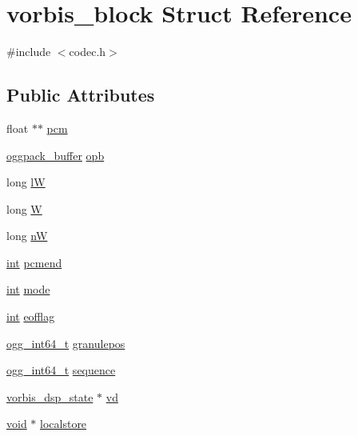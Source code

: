 \hypertarget{structvorbis__block}{}\section{vorbis\+\_\+block Struct Reference}
\label{structvorbis__block}


{\ttfamily \#include $<$codec.\+h$>$}

\subsection*{Public Attributes}
\begin{DoxyCompactItemize}
\item 
float $\ast$$\ast$ \hyperlink{structvorbis__block_ac8312d70a6e63afc01d3df8a54ac6508}{pcm}
\item 
\hyperlink{structoggpack__buffer}{oggpack\+\_\+buffer} \hyperlink{structvorbis__block_a43f1746974a729fa4e835ef995f9782a}{opb}
\item 
long \hyperlink{structvorbis__block_a97675088561ed9aa4559e869aafd1f2c}{lW}
\item 
long \hyperlink{structvorbis__block_a1e420440dd6a5a39262c0fe7afa8435a}{W}
\item 
long \hyperlink{structvorbis__block_a6fa002c8c36ad39c1c015cfa673dda28}{nW}
\item 
\hyperlink{xmltok_8h_a5a0d4a5641ce434f1d23533f2b2e6653}{int} \hyperlink{structvorbis__block_a946562a7fdb80cabf6ee749bdce1a0ed}{pcmend}
\item 
\hyperlink{xmltok_8h_a5a0d4a5641ce434f1d23533f2b2e6653}{int} \hyperlink{structvorbis__block_adab44bb8520c9d5daafee3f1a1bcf538}{mode}
\item 
\hyperlink{xmltok_8h_a5a0d4a5641ce434f1d23533f2b2e6653}{int} \hyperlink{structvorbis__block_a7bc1252bc17a2cd1ee2a4154fdd2617b}{eofflag}
\item 
\hyperlink{config__types_8h_a292432ede703993aa88db876e11b2306}{ogg\+\_\+int64\+\_\+t} \hyperlink{structvorbis__block_a3dc7d5e474ae80ea641df91eba16b490}{granulepos}
\item 
\hyperlink{config__types_8h_a292432ede703993aa88db876e11b2306}{ogg\+\_\+int64\+\_\+t} \hyperlink{structvorbis__block_a09e48c70ae79cae2d37a4e0e55f294ef}{sequence}
\item 
\hyperlink{structvorbis__dsp__state}{vorbis\+\_\+dsp\+\_\+state} $\ast$ \hyperlink{structvorbis__block_adefe79be61ef3631c18cd7b8afae31a2}{vd}
\item 
\hyperlink{sound_8c_ae35f5844602719cf66324f4de2a658b3}{void} $\ast$ \hyperlink{structvorbis__block_a457093b574de4317ae1b2505a868a5fb}{localstore}
$$
\end{DoxyCompactItemize}
